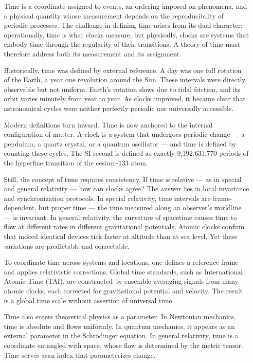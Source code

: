 Time is a coordinate assigned to events, an ordering imposed on phenomena, and a physical quantity whose measurement depends on the reproducibility of periodic processes. The challenge in defining time arises from its dual character: operationally, time is what clocks measure, but physically, clocks are systems that embody time through the regularity of their transitions. A theory of time must therefore address both its measurement and its assignment.

Historically, time was defined by external reference. A day was one full rotation of the Earth, a year one revolution around the Sun. These intervals were directly observable but not uniform. Earth's rotation slows due to tidal friction, and its orbit varies minutely from year to year. As clocks improved, it became clear that astronomical cycles were neither perfectly periodic nor universally accessible.

Modern definitions turn inward. Time is now anchored to the internal configuration of matter. A clock is a system that undergoes periodic change — a pendulum, a quartz crystal, or a quantum oscillator — and time is defined by counting these cycles. The SI second is defined as exactly 9,192,631,770 periods of the hyperfine transition of the cesium-133 atom.

Still, the concept of time requires consistency. If time is relative — as in special and general relativity — how can clocks agree? The answer lies in local invariance and synchronization protocols. In special relativity, time intervals are frame-dependent, but proper time — the time measured along an observer’s worldline — is invariant. In general relativity, the curvature of spacetime causes time to flow at different rates in different gravitational potentials. Atomic clocks confirm that indeed identical devices tick faster at altitude than at sea level. Yet these variations are predictable and correctable.

To coordinate time across systems and locations, one defines a reference frame and applies relativistic corrections. Global time standards, such as International Atomic Time (TAI), are constructed by ensemble averaging signals from many atomic clocks, each corrected for gravitational potential and velocity. The result is a global time scale without assertion of universal time. 

Time also enters theoretical physics as a parameter. In Newtonian mechanics, time is absolute and flows uniformly. In quantum mechanics, it appears as an external parameter in the Schrödinger equation. In general relativity, time is a coordinate entangled with space, whose flow is determined by the metric tensor. Time serves asan index that parameterizes change.

